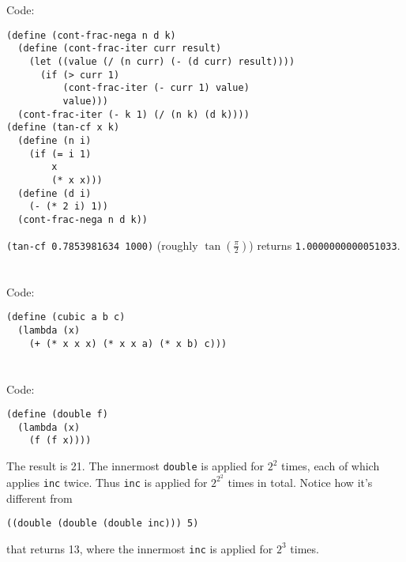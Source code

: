 \documentclass[../main.tex]{subfiles}
\begin{document}

\section{}

Code:

\begin{lstlisting}
(define (cont-frac-nega n d k)
  (define (cont-frac-iter curr result)
    (let ((value (/ (n curr) (- (d curr) result))))
      (if (> curr 1)
          (cont-frac-iter (- curr 1) value)
          value)))
  (cont-frac-iter (- k 1) (/ (n k) (d k))))
(define (tan-cf x k)
  (define (n i)
    (if (= i 1)
        x
        (* x x)))
  (define (d i)
    (- (* 2 i) 1))
  (cont-frac-nega n d k))
\end{lstlisting}

\lstinline{(tan-cf 0.7853981634 1000)} (roughly $\tan(\frac{\pi}{2})$)
 returns \lstinline{1.0000000000051033}.


\section{}

Code:

\begin{lstlisting}
(define (cubic a b c)
  (lambda (x)
    (+ (* x x x) (* x x a) (* x b) c)))
\end{lstlisting}


\section{}

Code:

\begin{lstlisting}
(define (double f)
  (lambda (x)
    (f (f x))))
\end{lstlisting}

The result is 21. The innermost \lstinline{double}
 is applied for $2^2$ times, each of which applies
 \lstinline{inc} twice. Thus \lstinline{inc} is applied
 for $2^{2^2}$ times in total. Notice how it's
 different from

\begin{lstlisting}
((double (double (double inc))) 5)
\end{lstlisting}

that returns 13, where the innermost \lstinline{inc} is
 applied for $2^3$ times.
\end{document}
